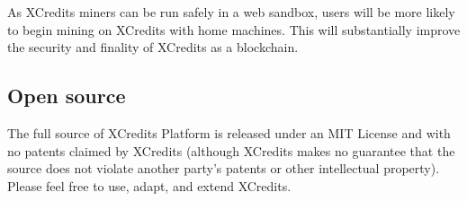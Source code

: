 \documentclass[a4paper,12pt]{article}
\begin{document}
As XCredits miners can be run safely in a web sandbox, users will be more likely to begin mining on XCredits with home machines. This will substantially improve the security and finality of XCredits as a blockchain.


\subsection{Open source}
The full source of XCredits Platform is released under an MIT License and with no patents claimed by XCredits (although XCredits makes no guarantee that the source does not violate another party's patents or other intellectual property). Please feel free to use, adapt, and extend XCredits. 


\glsaddall

\printglossaries
\end{document}
